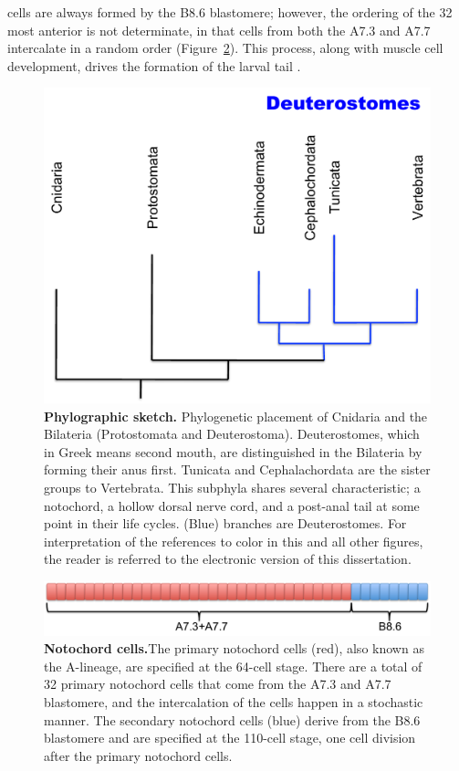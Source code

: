 cells are always formed by the B8.6 blastomere; however, the ordering of the 32 most anterior is not determinate, in that cells from both the A7.3 and A7.7 intercalate in a random order (Figure~\ref{fig:noto_cells})\cite{nishida_cell_1983,nishida_cell_1985,miyamoto_formation_1985, swalla_mechanisms_1993,kourakis_one-dimensional_2014}. This process, along with muscle cell development, drives the formation of the larval tail \cite{miyamoto_formation_1985, jeffery_factors_1992,swalla_mechanisms_1993}.
\begin{figure}[tbp]
\centering
\includegraphics[scale=0.5]{figures/phylogeny.pdf}
\caption{\textbf{Phylographic sketch.} Phylogenetic placement of Cnidaria and the Bilateria (Protostomata and Deuterostoma). Deuterostomes, which in Greek means second mouth, are distinguished in the Bilateria by forming their anus first. Tunicata and Cephalachordata are the sister groups to Vertebrata. This subphyla shares several characteristic; a notochord, a hollow dorsal nerve cord, and a post-anal tail at some point in their life cycles. (Blue) branches are Deuterostomes. For interpretation of the references to color in this and all other figures, the reader is referred to the electronic version of this dissertation.}
\label{fig:noto_cells}
\end{figure}

\begin{figure}[thbp]
\centering
\includegraphics[scale=0.5]{figures/noto_cells.pdf}
\caption{\textbf{Notochord cells.}The primary notochord cells (red), also known as the A-lineage, are specified at the 64-cell stage. There are a total of 32 primary notochord cells that come from the A7.3 and A7.7 blastomere, and the intercalation of the cells happen in a stochastic manner. The secondary notochord cells (blue) derive from the B8.6 blastomere and are specified at the 110-cell stage, one cell division after the primary notochord cells.}
\label{fig:noto_cells}
\end{figure}

